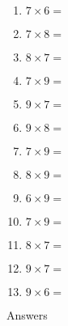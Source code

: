 \documentclass[11pt]{article}\usepackage[a4paper,margin=0.90in,tmargin=0.5in]{geometry}\usepackage{amsmath, amsthm, amssymb}
\begin{document}
\begin{multicols*}{4}
\begin{enumerate}[itemsep=2.3\baselineskip]
\item $7 \times 6 =$ 
\item $7 \times 8 =$ 
\item $8 \times 7 =$ 
\item $7 \times 9 =$ 
\item $9 \times 7 =$ 
\item $9 \times 8 =$ 
\item $7 \times 9 =$ 
\item $8 \times 9 =$ 
\item $6 \times 9 =$ 
\item $7 \times 9 =$ 
\item $8 \times 7 =$ 
\item $9 \times 7 =$ 
\item $9 \times 6 =$ 
\end{enumerate}
\vfill
\end{multicols*}
\newpage\vspace{\baselineskip}
\begin{center}
{\Huge Answers}
\end{center}
\end{document}
